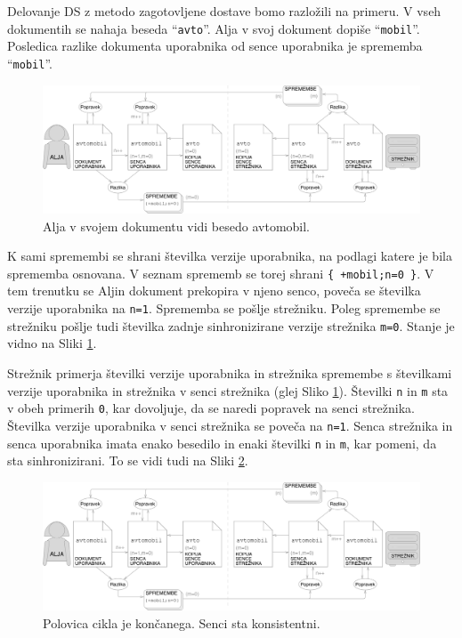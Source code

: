 \documentclass[a4paper, 12pt, twoside]{book}
\begin{document}
Delovanje DS z metodo zagotovljene dostave bomo razložili na primeru. V vseh dokumentih se nahaja beseda “{\tt avto}”. Alja v svoj dokument dopiše “{\tt mobil}”. Posledica razlike dokumenta uporabnika od sence uporabnika je sprememba “{\tt mobil}”.

\begin{figure}[placement h]
\begin{center}
\includegraphics[width=16cm]{img/ds4.pdf}
\end{center}
\caption{Alja v svojem dokumentu vidi besedo avtomobil.}
\label{ds4}
\end{figure}

K sami spremembi se shrani številka verzije uporabnika, na podlagi katere je bila sprememba osnovana. V seznam sprememb se torej shrani {\tt \{ +mobil;n=0 \}}. V tem trenutku se Aljin dokument prekopira v njeno senco, poveča se številka verzije uporabnika na {\tt n=1}. Sprememba se pošlje strežniku. Poleg spremembe se strežniku pošlje tudi številka zadnje sinhronizirane verzije strežnika {\tt m=0}. Stanje je vidno na Sliki \ref{ds4}.

Strežnik primerja številki verzije uporabnika in strežnika spremembe s številkami verzije uporabnika in strežnika v senci strežnika (glej Sliko \ref{ds4}). Številki {\tt n} in {\tt m} sta v obeh primerih {\tt 0}, kar dovoljuje, da se naredi popravek na senci strežnika. Številka verzije uporabnika v senci strežnika se poveča na {\tt n=1}. Senca strežnika in senca uporabnika imata enako besedilo in enaki številki {\tt n} in {\tt m}, kar pomeni, da sta sinhronizirani. To se vidi tudi na Sliki \ref{ds5}.

\begin{figure}[placement h]
\begin{center}
\includegraphics[width=16cm]{img/ds5.pdf}
\end{center}
\caption{Polovica cikla je končanega. Senci sta konsistentni.}
\label{ds5}
\end{figure}
\end{document}
